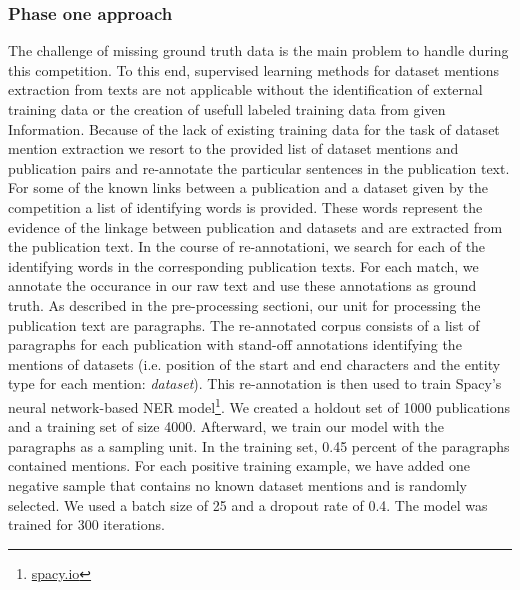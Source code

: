 \subsubsection{Phase one approach}
The challenge of missing ground truth data is the main problem to handle during this competition.
To this end, supervised learning methods for dataset mentions extraction from texts are not applicable without the identification of external training data or the creation of usefull labeled training data from given Information.
Because of the lack of existing training data for the task of dataset mention extraction we resort to the provided list of dataset mentions and publication pairs and re-annotate the particular sentences in the publication text.
For some of the known links between a publication and a dataset given by the competition a list of identifying words is provided.
These words represent the evidence of the linkage between publication and datasets and are extracted from the publication text.
In the course of re-annotationi, we search for each of the identifying words in the corresponding publication texts.
For each match, we annotate the occurance in our raw text and use these annotations as ground truth.
As described in the pre-processing sectioni, our unit for processing the publication text are paragraphs.
The re-annotated corpus consists of a list of paragraphs for each publication with stand-off annotations identifying the mentions of datasets (i.e. position of the start and end characters and the entity type for each mention: \emph{dataset}).
This re-annotation is then used to train Spacy's neural network-based NER model\footnote{\url{spacy.io}}.
We created a holdout set of 1000 publications and a training set of size 4000.
Afterward, we train our model with the paragraphs as a sampling unit.
In the training set, 0.45 percent of the paragraphs contained mentions.
For each positive training example, we have added one negative sample that contains no known dataset mentions and is randomly selected.   
We used a batch size of 25 and a dropout rate of 0.4.
The model was trained for 300 iterations.
